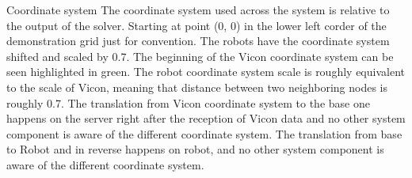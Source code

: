 \sec Coordinate system
\finalGrid
The coordinate system used across the system is relative to the output of the solver. Starting at point (0, 0) in the lower left corder of the demonstration grid just for convention. The robots have the coordinate system shifted and scaled by 0.7. The beginning of the Vicon coordinate system can be seen highlighted in green. The robot coordinate system scale is roughly equivalent to the scale of Vicon, meaning that distance between two neighboring nodes is roughly 0.7.\br
The translation from Vicon coordinate system to the base one happens on the server right after the reception of Vicon data and no other system component is aware of the different coordinate system.
The translation from base to Robot and in reverse happens on robot, and no other system component is aware of the different coordinate system.

